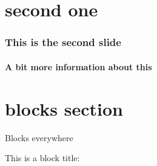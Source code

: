 \documentclass[aspectratio=169,ngerman]{beamer}
\begin{document}
\section{second one}

  \begin{frame}
    \frametitle{This is the second slide}
    \framesubtitle{A bit more information about this}
    \blindtext
  \end{frame}

\section{blocks section}

    \begin{frame}{Blocks everywhere}
        \begin{block}{This is a block title:}
            \blindtext
        \end{block}
    \end{frame}
\end{document}
